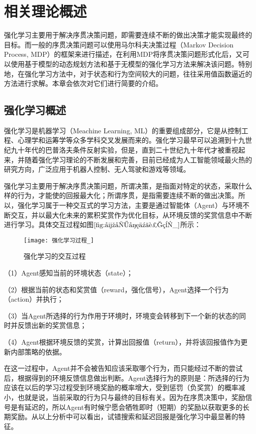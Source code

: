 \chapter{相关理论概述}

强化学习主要用于解决序贯决策问题，即需要连续不断的做出决策才能实现最终的目标。而一般的序贯决策问题可以使用马尔科夫决策过程（Markov Decision Process, MDP）的框架来进行描述，在利用MDP将序贯决策问题形式化后，又可以使用基于模型的动态规划方法和基于无模型的强化学习方法来解决该问题。特别地，在强化学习方法中，对于状态和行为空间较大的问题，往往采用值函数逼近的方法进行求解。本章会依次对它们进行简要的介绍。

\section{强化学习概述}
强化学习是机器学习（Meachine Learning, ML）的重要组成部分，它是从控制工程、心理学和运筹学等众多学科交叉发展而来的。强化学习最早可以追溯到十九世纪九十年代的巴普洛夫条件反射实验，但是，直到二十世纪九十年代才被重视起来，并随着强化学习理论的不断发展和完善，目前已经成为人工智能领域最火热的研究方向，广泛应用于机器人控制、无人驾驶和游戏等领域。

强化学习主要用于解决序贯决策问题，所谓决策，是指面对特定的状态，采取什么样的行为，才能使的回报最大化；所谓序贯，是指需要连续不断的做出决策。所以，强化学习属于一种交互式的学习方法，主要是通过智能体（Agent）与环境不断交互，并以最大化未来的累积奖赏作为优化目标，从环境反馈的奖赏信息中不断进行学习。具体交互过程如图$\ref{fig:强化学习过程_}$所示：
\begin{figure}[htbp]
\centering
\texttt{[image: 强化学习过程\_]}
\caption{强化学习的交互过程}
\label{fig:强化学习过程_}
\end{figure}

（1）Agent感知当前的环境状态（state）；

（2）根据当前的状态和奖赏值（reward，强化信号），Agent选择一个行为（action）并执行；

（3）当Agent所选择的行为作用于环境时，环境变会转移到下一个新的状态的同时并反馈出新的奖赏信息；

（4）Agent根据环境反馈的奖赏，计算出回报值（return），并将该回报值作为更新内部策略的依据。

 在这一过程中，Agent并不会被告知应该采取哪个行为，而只能经过不断的尝试后，根据得到的环境反馈信息做出判断。Agent选择行为的原则是：所选择的行为应该在以后的学习过程受到环境奖励的概率增大，受到惩罚（负奖赏）的概率减小，也就是说，当前采取的行为只与最终的目标有关。因为在序贯决策中，奖励信号是有延迟的，所以Agent有时候宁愿会牺牲即时（短期）的奖励以获取更多的长期奖励。从以上分析中可以看出，试错搜索和延迟回报是强化学习中最显著的特征。

